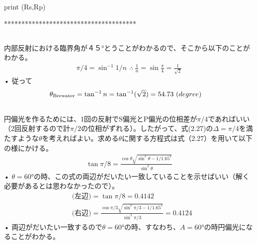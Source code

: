 \documentclass{jsarticle}
\begin{document}
print (Rs,Rp)

**************************************

\subsection{}
内部反射における臨界角が４５°とうことがわかるので、そこから以下のことがわかる。
\begin{align}
\pi/4 = \sin^{-1}{1/n} \ \   \therefore \ \frac{1}{n} = \sin\frac{\pi}{4}= \frac{1}{\sqrt{2}}
\end{align}•
従って
\begin{align}
&\theta_{\rm{Brewater}}= \tan^{-1}n=\tan^{-1}(\sqrt{2})=54.73\ (degree) 
\end{align}

\subsection{}
円偏光を作るためには、1回の反射でS偏光とP偏光の位相差が$\pi/4$であればいい（2回反射するので計$\pi/2$の位相がずれる）。したがって、式(2.27)の$\Delta=\pi/4$を満たすような$\theta$を考えればよい。求める$\theta$に関する方程式は式（2.27）を用いて以下の様にかける。
\begin{align}
\tan\pi/8= \frac{\cos\theta\sqrt{\sin^2\theta-1/1.65^2}}{\sin^2\theta}
\end{align}•
$\theta=60°$の時、この式の両辺がだいたい一致していることを示せばいい（解く必要があるとは思わなかったので）。
\begin{align}
&\mbox{(左辺)}=\tan\pi/8=0.4142 \\
&\mbox{(右辺)}=\frac{\cos\pi/3\sqrt{\sin^2\pi/3-1/1.65^2}}{\sin^2\pi/3}=0.4124
\end{align}•
両辺がだいたい一致するので$\theta=60°$の時、すなわち、$A=60°$の時円偏光になることがわかる。

\subsection{}
\end{document}
